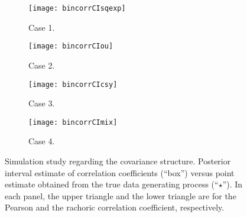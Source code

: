  \begin{figure}[t!]
    \centering
    \begin{subfigure}[b]{0.24\textwidth}
            \texttt{[image: bincorrCIsqexp]}
            \caption{Case 1.}
    \end{subfigure}
    \begin{subfigure}[b]{0.24\textwidth}
            \texttt{[image: bincorrCIou]}
            \caption{Case 2.}
    \end{subfigure}
    \begin{subfigure}[b]{0.24\textwidth}
            \texttt{[image: bincorrCIcsy]}
            \caption{Case 3.}
    \end{subfigure}
    \begin{subfigure}[b]{0.24\textwidth}
            \texttt{[image: bincorrCImix]}
            \caption{Case 4.}
    \end{subfigure}
    \caption{Simulation study regarding the covariance structure. Posterior interval estimate of correlation coefficients (``box'') versus point estimate obtained from the true data generating process (``$\star$''). In each panel, the upper triangle and the lower triangle are for the Pearson and the  rachoric correlation coefficient, respectively.}
    \label{fig:bincorrCI}
\end{figure}



